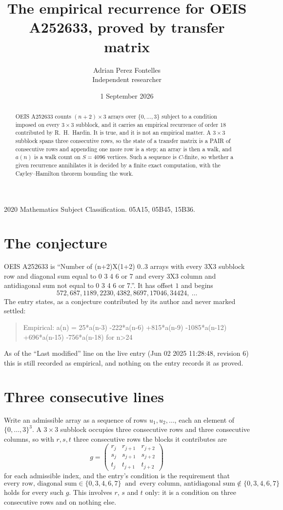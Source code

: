 \documentclass[11pt,a4paper]{article}
\title{The empirical recurrence for OEIS A252633, proved by transfer matrix}
\author{Adrian Perez Fontelles\\ \small Independent researcher}
\date{1 September 2026}
\theoremstyle{plain}
\theoremstyle{definition}
\begin{document}
\maketitle

\begin{abstract}
OEIS A252633 counts $(n+2)\times3$ arrays over $\{0,\dots,3\}$ subject to a condition imposed on
every $3\times3$ subblock, and it carries an empirical recurrence of order $18$
contributed by R.~H.~Hardin. It is true, and it is not an empirical matter. A $3\times3$
subblock spans three consecutive rows, so the state of a transfer matrix is a PAIR of
consecutive rows and appending one more row is a step; an array is then a walk, and
$a(n)$ is a walk count on $S=4096$ vertices. Such a sequence is $C$-finite, so whether a given
recurrence annihilates it is decided by a finite exact computation, with the Cayley--Hamilton
theorem bounding the work.
\end{abstract}

\noindent\small 2020 Mathematics Subject Classification. 05A15, 05B45, 15B36.\normalsize

\section{The conjecture}

OEIS A252633 is ``Number of (n+2)X(1+2) 0..3 arrays with every 3X3 subblock row and diagonal sum equal to 0 3 4 6 or 7 and every 3X3 column and antidiagonal sum not equal to 0 3 4 6 or 7.''. It has offset $1$ and begins
\[
572, 687, 1189, 2230, 4382, 8697, 17046, 34424,\ \dots
\]
The entry states, as a conjecture contributed by its author and never marked settled:
\begin{quote}
Empirical: a(n) = 25*a(n-3) -222*a(n-6) +815*a(n-9) -1085*a(n-12) +696*a(n-15) -756*a(n-18) for n>24
\end{quote}
As of the ``Last modified'' line on the live entry (Jun 02 2025 11:28:48, revision 6) this is still
recorded as empirical, and nothing on the entry records it as proved.

\section{Three consecutive lines}

Write an admissible array as a sequence of rows $u_1,u_2,\dots$, each an element of
$\{0,\dots,3\}^{3}$. A $3\times3$ subblock occupies three consecutive rows and
three consecutive columns, so with $r,s,t$ three consecutive rows the blocks it
contributes are
\[
g=\begin{pmatrix}r_j&r_{j+1}&r_{j+2}\\ s_j&s_{j+1}&s_{j+2}\\ t_j&t_{j+1}&t_{j+2}\end{pmatrix}
\]
for each admissible index, and the entry's condition is the requirement that
\[
\text{every row, diagonal sum} \in \{0,3,4,6,7\}\ \text{ and }\ \text{every column, antidiagonal sum} \notin \{0,3,4,6,7\}
\]
holds for every such $g$. This involves $r$, $s$ and $t$ only: it is a condition on
three consecutive rows and on nothing else.
\end{document}
